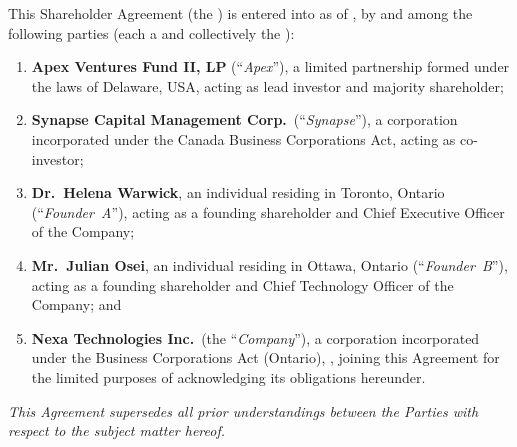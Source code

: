 \begin{tcolorbox}[legalbox, title={PARTIES TO THIS AGREEMENT}]
  \noindent
  This Shareholder Agreement (the ) is entered into as of
  \textbf{\effectivedate}, by and among the following parties (each a
   and collectively the ):

  \medskip
  \begin{enumerate}[label=\textbf{\arabic*.}, leftmargin=*, itemsep=4pt]
    \item \textbf{Apex Ventures Fund II, LP} (``\textit{Apex}''), a limited
          partnership formed under the laws of Delaware, USA, acting as lead
          investor and majority shareholder;

    \item \textbf{Synapse Capital Management Corp.}\ (``\textit{Synapse}''), a
          corporation incorporated under the Canada Business Corporations Act,
          acting as co-investor;

    \item \textbf{Dr.\ Helena Warwick}, an individual residing in Toronto,
          Ontario (``\textit{Founder~A}''), acting as a founding shareholder and
          Chief Executive Officer of the Company;

    \item \textbf{Mr.\ Julian Osei}, an individual residing in Ottawa, Ontario
          (``\textit{Founder~B}''), acting as a founding shareholder and Chief
          Technology Officer of the Company; and

    \item \textbf{Nexa Technologies Inc.}\ (the ``\textit{Company}''), a
          corporation incorporated under the Business Corporations Act (Ontario),
          \companyreg, joining this Agreement for the limited purposes of
          acknowledging its obligations hereunder.
  \end{enumerate}
\end{tcolorbox}

\vspace{0.7cm}

{%
  \small\color{NavyMid}
}

\vspace{0.5cm}
\begin{center}
  \small\color{SlateRule}
  \textit{This Agreement supersedes all prior understandings between the Parties
  with respect to the subject matter hereof.}
\end{center}

\newpage
